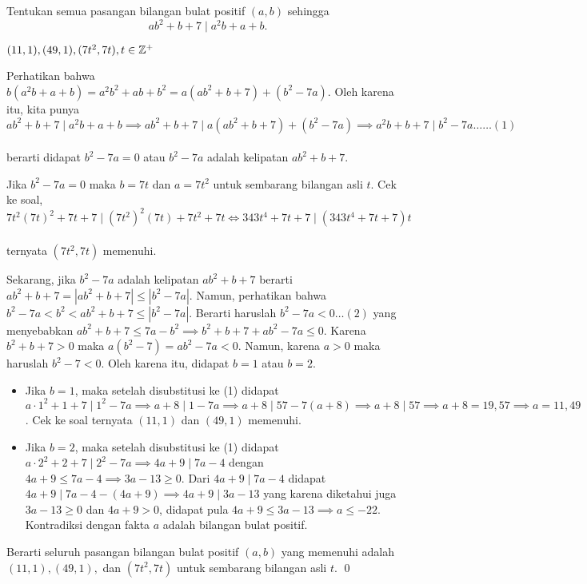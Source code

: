 \documentclass[11pt]{scrartcl}
\begin{document}
	\begin{soalbaru} Tentukan semua pasangan bilangan bulat positif $(a,b)$ sehingga\\[-18pt] $$ab^2+b+7 \mid a^2b+a+b.$$
	\begin{jawaban}
	$(11,1),(49,1),(7t^2,7t), t \in \mathbb Z^+$
	\end{jawaban}
	\begin{solusi}
	Perhatikan bahwa $b(a^2b+a+b)=a^2b^2+ab+b^2=a(ab^2+b+7)+(b^2-7a)$. Oleh karena itu, kita punya\\[-20pt]$$ab^2+b+7 \mid a^2b+a+b \implies ab^2+b+7 \mid a(ab^2+b+7)+(b^2-7a) \implies a^2b+b+7 \mid b^2-7a \dots \dots (1)$$\\[-20pt] berarti didapat $b^2-7a=0$ atau $b^2-7a$ adalah kelipatan $ab^2+b+7$.
	
	Jika $b^2-7a=0$ maka $b=7t$ dan $a=7t^2$ untuk sembarang bilangan asli $t$. Cek ke soal,\\[-17pt]$$7t^2(7t)^2+7t+7 \mid (7t^2)^2(7t)+7t^2+7t \iff 343t^4+7t+7 \mid (343t^4+7t+7)t $$\\[-25pt] ternyata $(7t^2,7t)$ memenuhi.
	
	Sekarang, jika $b^2-7a$ adalah kelipatan $ab^2+b+7$ berarti $ab^2+b+7=|ab^2+b+7|\le |b^2-7a|$. Namun, perhatikan bahwa $b^2-7a < b^2 < ab^2+b+7 \le |b^2-7a|$. Berarti haruslah $b^2-7a<0 \dots (2)$ yang menyebabkan $ab^2+b+7 \le 7a-b^2 \implies b^2+b+7+ab^2-7a \le 0$. Karena $b^2+b+7 >0$ maka $a(b^2-7)=ab^2-7a<0$. Namun, karena $a>0$ maka haruslah $b^2-7<0$. Oleh karena itu, didapat $b=1$ atau $b=2$.
	
	\begin{itemize}
	\item Jika $b=1$, maka setelah disubstitusi ke (1) didapat $a\cdot 1^2+1+7 \mid 1^2 - 7a \implies a+8 \mid 1-7a \implies a+8 \mid 57-7(a+8) \implies a+8\mid 57 \implies a+8=19,57 \implies a=11,49$. Cek ke soal ternyata $(11,1)$ dan $(49,1)$ memenuhi.
		
	\item Jika $b=2$, maka setelah disubstitusi ke (1) didapat $a\cdot 2^2+2+7 \mid 2^2 -7a \implies 4a+9 \mid 7a-4 $ dengan $4a+9 \le 7a-4 \implies 3a-13 \ge 0$. Dari $4a+9 \mid 7a-4$ didapat $4a+9 \mid 7a-4 - (4a+9) \implies 4a+9 \mid 3a-13$ yang karena diketahui juga $3a-13 \ge 0$ dan $4a+9>0$, didapat pula $4a+9 \le 3a-13 \implies a \le -22$. Kontradiksi dengan fakta $a$ adalah bilangan bulat positif.
	\end{itemize}
	
	Berarti seluruh pasangan bilangan bulat positif $(a,b)$ yang memenuhi adalah $(11,1),(49,1),$ dan $(7t^2,7t)$ untuk sembarang bilangan asli $t$. \qed
	\end{solusi}
	
	\end{soalbaru}
	
\end{document}

